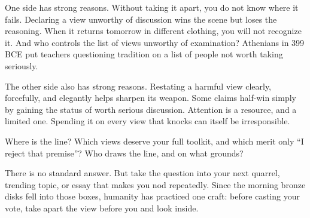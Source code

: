 One side has strong reasons. Without taking it apart, you do not know where it fails. Declaring a view unworthy of discussion wins the scene but loses the reasoning. When it returns tomorrow in different clothing, you will not recognize it. And who controls the list of views unworthy of examination? Athenians in 399 BCE put teachers questioning tradition on a list of people not worth taking seriously.

The other side also has strong reasons. Restating a harmful view clearly, forcefully, and elegantly helps sharpen its weapon. Some claims half-win simply by gaining the status of worth serious discussion. Attention is a resource, and a limited one. Spending it on every view that knocks can itself be irresponsible.

Where is the line? Which views deserve your full toolkit, and which merit only ``I reject that premise''? Who draws the line, and on what grounds?

There is no standard answer. But take the question into your next quarrel, trending topic, or essay that makes you nod repeatedly. Since the morning bronze disks fell into those boxes, humanity has practiced one craft: before casting your vote, take apart the view before you and look inside.

